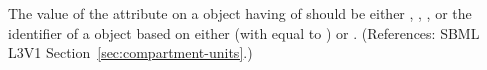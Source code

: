 The value of the  attribute on a \Compartment object having
 of  should be either ,
, , or the identifier of a \UnitDefinition
object based on either  (with  equal to
) or .  (References: SBML L3V1
Section~\ref{sec:compartment-units}.)
